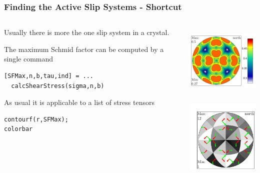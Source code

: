 \documentclass[compress]{beamer}
\begin{document}





\begin{frame}[fragile]
  \frametitle{Finding the Active Slip Systems - Shortcut}

  \begin{columns}
    \begin{column}{7cm}
      Usually there is more the one slip system in a crystal.

      The maximum Schmid factor can be computed by a single command
  \begin{lstlisting}[style=input]
[SFMax,n,b,tau,ind] = ...
  calcShearStress(sigma,n,b)
  \end{lstlisting}

  \bigskip
  \pause

  As usual it is applicable to a list of stress tensors
  \begin{lstlisting}[style=input]
contourf(r,SFMax);
colorbar
  \end{lstlisting}
    \end{column}
    \begin{column}{4cm}
      \includegraphics[height=3.5cm]{pic/SFMax}

\includegraphics[height=3.5cm]{pic/SFActive}
\end{column}
  \end{columns}


\end{frame}
\end{document}
